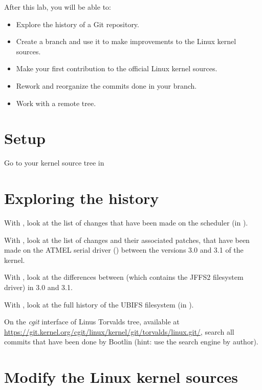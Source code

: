 
After this lab, you will be able to:

\begin{itemize}
\item Explore the history of a Git repository.
\item Create a branch and use it to make improvements to the Linux kernel sources.
\item Make your first contribution to the official Linux kernel sources.
\item Rework and reorganize the commits done in your branch.
\item Work with a remote tree.
\end{itemize}

\section{Setup}

Go to your kernel source tree in 

\section{Exploring the history}

With , look at the list of changes that have been made on the scheduler
(in ).

With , look at the list of changes and their associated
patches, that have been made on the ATMEL serial driver
() between the versions 3.0
and 3.1 of the kernel.

With , look at the differences between 
(which contains the JFFS2 filesystem driver) in 3.0 and 3.1.

With , look at the full history of the UBIFS filesystem (in
).

On the {\em cgit} interface of Linus Torvalds tree, available at
\url{https://git.kernel.org/cgit/linux/kernel/git/torvalds/linux.git/},
search all commits that have been done by Bootlin (hint: use
the search engine by author).

\section{Modify the Linux kernel sources}

